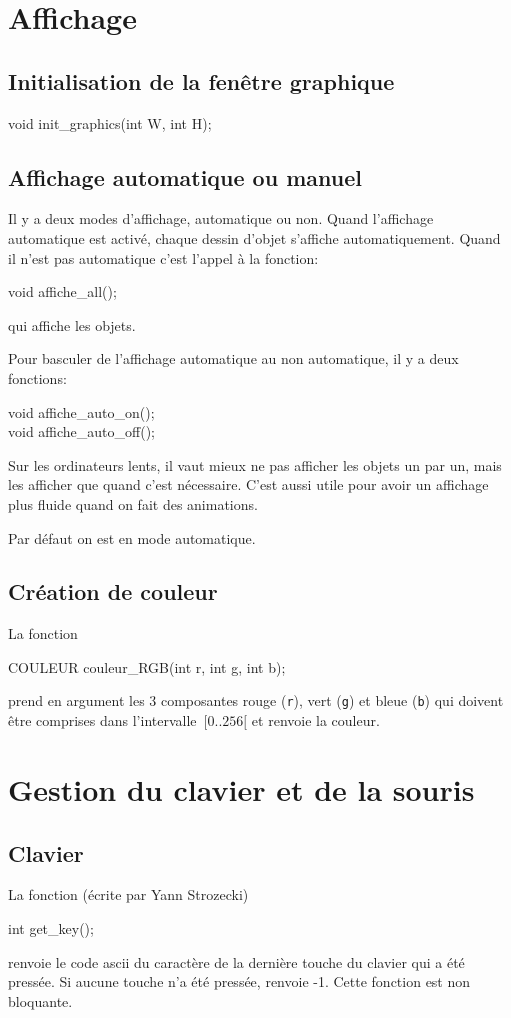 \documentclass{article}
\newcommand\code[1]{
\begin{mdframed}[linecolor=purple,backgroundcolor=blue!10]
{\tt
#1
}
\end{mdframed}
}
\begin{document}
\section{Affichage}
\subsection{Initialisation de la fenêtre graphique}

\code{
void init\_graphics(int W, int H);
}

\subsection{Affichage automatique ou manuel}
\label{sec:aam}
Il y a deux modes d'affichage, automatique ou non. Quand l'affichage 
automatique est activé, chaque dessin d'objet s'affiche automatiquement. 
Quand il n'est pas automatique c'est l'appel à la fonction:
\code{
void affiche\_all();
}
qui affiche les objets.

Pour basculer de l'affichage automatique au non automatique, il y a 
deux fonctions:
\code{
void affiche\_auto\_on(); \\
void affiche\_auto\_off();
}
Sur les ordinateurs lents, il vaut mieux ne pas afficher 
les objets un par un, mais les afficher que quand c'est nécessaire.
C'est aussi utile pour avoir un affichage plus fluide quand on fait
des animations.

Par défaut on est en mode automatique.

\subsection{Création de couleur}
La fonction
\code{
COULEUR couleur\_RGB(int r, int g, int b);
}
prend en argument les 3 composantes rouge (\texttt{r}), vert (\texttt{g})
et bleue (\texttt{b}) qui doivent être comprises
dans l'intervalle~$[0..256[$ et renvoie la couleur.


\section{Gestion du clavier et de la souris}
\subsection{Clavier}
La fonction (écrite par Yann Strozecki)
\code{
int get\_key();
}
renvoie le code ascii du caractère de la dernière touche du clavier qui a été pressée.
Si aucune touche n'a été pressée, renvoie -1.
Cette fonction est non bloquante.
\end{document}
